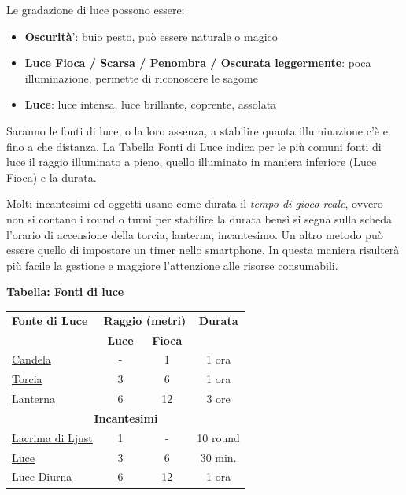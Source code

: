 \begin{multicols}{2}
Le gradazione di luce possono essere:
\begin{itemize}[leftmargin=*] \setlength{\itemsep}{0pt}
\item
\textbf{Oscurità}': buio pesto, può essere naturale o magico
\item
\textbf{Luce Fioca / Scarsa / Penombra / Oscurata leggermente}: poca illuminazione, permette di riconoscere le sagome
\item
\textbf{Luce}: luce intensa, luce brillante, coprente, assolata
\end{itemize}

Saranno le fonti di luce, o la loro assenza, a stabilire quanta illuminazione c'è e fino a che distanza. La Tabella Fonti di Luce indica per le più comuni fonti di luce il raggio illuminato a pieno, quello illuminato in maniera inferiore (Luce Fioca) e la durata.

Molti incantesimi ed oggetti usano come durata il \emph{tempo di gioco reale}, ovvero non si contano i round o turni per stabilire la durata bensì si segna sulla scheda l'orario di accensione della torcia, lanterna, incantesimo. Un altro metodo può essere quello di impostare un timer nello smartphone. In questa maniera risulterà più facile la gestione e maggiore l'attenzione alle risorse consumabili.

\medskip

\textbf{Tabella: Fonti di luce}\label{fontidiluce}

\medskip


\noindent\begin{tabularx}{\linewidth}{l|cc|c}
	\toprule
\rowcolor{gray!20}\textbf{Fonte di Luce} &\multicolumn{2}{c}{\textbf{Raggio (metri)}}& \textbf{Durata} \\
& \textbf{Luce} & \textbf{Fioca} &\\
\toprule
\hyperlink{Candela}{Candela} & - & 1 & 1 ora\\
\rowcolor{gray!20}\hyperlink{Torcia}{Torcia} & 3 & 6 & 1 ora\\
\hyperlink{Lanterna}{Lanterna} & 6 & 12 & 3 ore \\
\multicolumn{4}{c}{\textbf{Incantesimi}}\\
\rowcolor{gray!20}\hyperlink{Lacrima di Ljust}{Lacrima di Ljust} & 1 & - & 10 round\\
\hyperlink{Luce}{Luce}& 3 & 6 &30 min. \\
\rowcolor{gray!20}\hyperlink{Luce Diurna}{Luce Diurna} & 6 & 12 & 1 ora
\end{tabularx}


\end{multicols}
